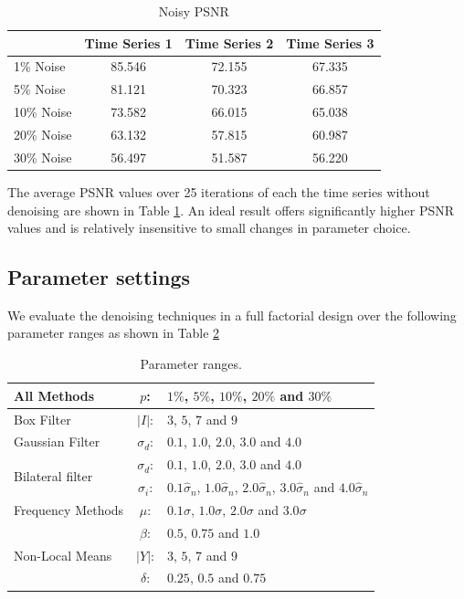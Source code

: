 \documentclass[11pt]{article}
\theoremstyle{definition}
\begin{document}
\begin{table}
\small
\begin{center}
\begin{tabular}{l c  c  c}
\hline
 & Time Series 1 & Time Series 2 & Time Series 3 \\ \hline
1\% Noise & 85.546 & 72.155 & 67.335 \\ \hline
5\% Noise & 81.121 & 70.323 & 66.857 \\ \hline
10\% Noise & 73.582 & 66.015 & 65.038 \\ \hline
20\% Noise & 63.132 & 57.815 & 60.987 \\ \hline
30\% Noise & 56.497 & 51.587 & 56.220\\
\hline
\end{tabular}
\caption{Noisy PSNR}
\label{noisypsnr}
\end{center}
\end{table}


The average PSNR values over 25 iterations of each the time series
without denoising are shown in Table \ref{noisypsnr}. An ideal result
offers significantly higher PSNR values and is relatively insensitive
to small changes in parameter choice.



\subsection{Parameter settings}

We evaluate the denoising techniques in a full factorial design over
the following parameter ranges as shown in Table \ref{ranges}

\begin{table}[h!]
\begin{center}
\begin{tabular}{lcl}
\hline
All Methods
& $p$:  & $1\%$, $5\%$, $10\%$, $20\%$ and $30\%$\\
\hline
Box Filter
& $\lvert I \rvert$: & $3$, $5$, $7$ and $9$\\
\hline
Gaussian Filter
& $\sigma_d$:  &$0.1$, $1.0$, $2.0$, $3.0$ and $4.0$\\
\hline
\multirow{2}{*}{Bilateral filter}
& $\sigma_d$:  &$0.1$, $1.0$, $2.0$, $3.0$ and $4.0$\\
& $\sigma_i$:  &$0.1 \hat{\sigma}_n$, $1.0 \hat{\sigma}_n$, $2.0 \hat{\sigma}_n$, $3.0 \hat{\sigma}_n$ and $4.0 \hat{\sigma}_n$\\
\hline
Frequency Methods
& $\mu$:  &$0.1 \sigma$, $1.0 \sigma$, $2.0 \sigma$ and $3.0 \sigma$\\
\hline
\multirow{3}{*}{Non-Local Means}
& $\beta$: &$0.5$, $0.75$ and $1.0$\\
& $\lvert Y \rvert$: &$3$, $5$, $7$ and $9$\\
& $\delta$: &$0.25$, $0.5$ and $0.75$\\
\hline
\end{tabular}
\caption{Parameter ranges.}
\label{ranges}
\end{center}
\end{table}
\end{document}
